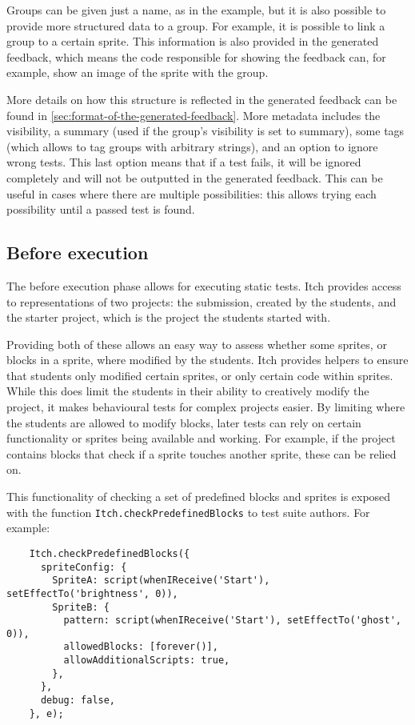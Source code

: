 \documentclass[../main]{subfiles}
\begin{document}
Groups can be given just a name, as in the example, but it is also possible to provide more structured data to a group.
For example, it is possible to link a group to a certain sprite.
This information is also provided in the generated feedback, which means the code responsible for showing the feedback can, for example, show an image of the sprite with the group.

More details on how this structure is reflected in the generated feedback can be found in \cref{sec:format-of-the-generated-feedback}.
More metadata includes the visibility, a summary (used if the group's visibility is set to summary), some tags (which allows to tag groups with arbitrary strings), and an option to ignore wrong tests.
This last option means that if a test fails, it will be ignored completely and will not be outputted in the generated feedback.
This can be useful in cases where there are multiple possibilities: this allows trying each possibility until a passed test is found.

\subsection{Before execution}\label{subsec:before-execution}

The before execution phase allows for executing static tests.
Itch provides access to representations of two projects: the submission, created by the students, and the starter project, which is the project the students started with.

Providing both of these allows an easy way to assess whether some sprites, or blocks in a sprite, where modified by the students.
Itch provides helpers to ensure that students only modified certain sprites, or only certain code within sprites.
While this does limit the students in their ability to creatively modify the project, it makes behavioural tests for complex projects easier.
By limiting where the students are allowed to modify blocks, later tests can rely on certain functionality or sprites being available and working.
For example, if the project contains blocks that check if a sprite touches another sprite, these can be relied on.

This functionality of checking a set of predefined blocks and sprites is exposed with the function \texttt{Itch.checkPredefinedBlocks} to test suite authors.
For example:

\begin{verbatim}
    Itch.checkPredefinedBlocks({
      spriteConfig: {
        SpriteA: script(whenIReceive('Start'), setEffectTo('brightness', 0)),
        SpriteB: {
          pattern: script(whenIReceive('Start'), setEffectTo('ghost', 0)),
          allowedBlocks: [forever()],
          allowAdditionalScripts: true,
        },
      },
      debug: false,
    }, e);
\end{verbatim}
\end{document}
